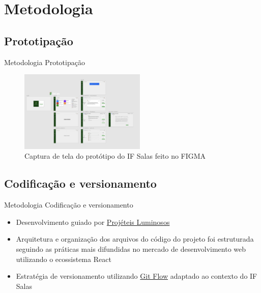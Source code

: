 \AtBeginSection[]{
	\begin{frame}
		\frametitle{}
		\tableofcontents[currentsection]
	\end{frame}
}

\section{Metodologia}

\subsection{Prototipação}
\begin{frame}{Metodologia}
	{Prototipação}
	\begin{figure}
		\includegraphics[width=6cm]{images/figma-proto.png}
		\caption{Captura de tela do protótipo do IF Salas feito no FIGMA}
	\end{figure}
\end{frame}

\subsection{Codificação e versionamento}
\begin{frame}{Metodologia}
	{Codificação e versionamento}
	\begin{itemize}[<+->]
		\item Desenvolvimento guiado por \href{https://www.artima.com/articles/tracer-bullets-and-prototypes}{Projéteis Luminosos}
		\item Arquitetura e organização dos arquivos do código do projeto foi estruturada seguindo as práticas mais difundidas no mercado de desenvolvimento web utilizando o ecossistema React
		\item Estratégia de versionamento utilizando \href{https://nvie.com/posts/a-successful-git-branching-model/}{Git Flow} adaptado ao contexto do IF Salas
	\end{itemize}
\end{frame}

